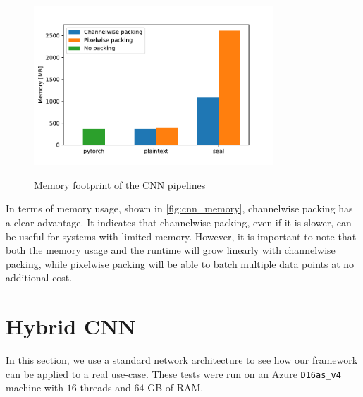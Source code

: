 \documentclass[a4paper,11pt,oneside]{report}
\begin{document}

\begin{figure}[h!]
  \centering
  \caption{Memory footprint of the CNN pipelines}
  \includegraphics[width=0.8\textwidth]{figures/cnn_mem.pdf}
  \label{fig:cnn_memory}
\end{figure}

In terms of memory usage, shown in \autoref{fig:cnn_memory}, channelwise packing has a clear advantage.
It indicates that channelwise packing, even if it is slower, can be useful for systems with limited memory.
However, it is important to note that both the memory usage and the runtime will grow linearly with channelwise packing, while pixelwise packing will be able to batch multiple data points at no additional cost.


\section{Hybrid CNN}

In this section, we use a standard network architecture to see how our framework can be applied to a real use-case. 
These tests were run on an Azure \texttt{D16as\_v4} machine with $16$ threads and $64$ GB of RAM.
\end{document}
